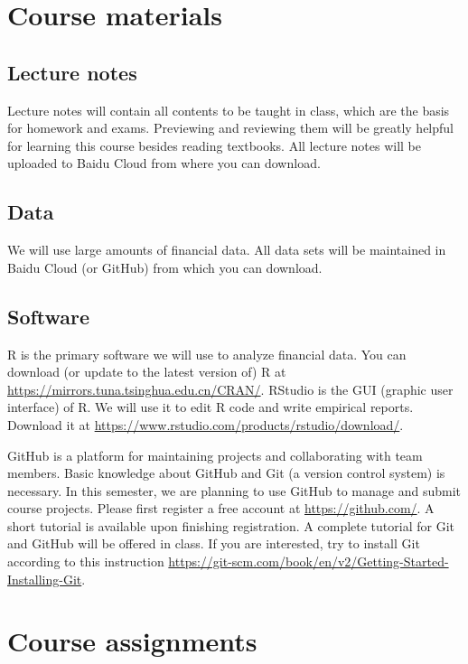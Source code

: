 \documentclass[a4paper,11pt]{article}
\begin{document}
\section{Course materials}
\label{sec:orgc5b5fd5}

\subsection*{Lecture notes}
\label{sec:orga87e58d}

Lecture notes will contain all contents to be taught in class, which
are the basis for homework and exams. Previewing and reviewing them
will be greatly helpful for learning this course besides reading
textbooks. All lecture notes will be uploaded to Baidu Cloud from
where you can download. 


\subsection*{Data}
\label{sec:orgb496d52}

We will use large amounts of financial data. All data sets will be
maintained in Baidu Cloud (or GitHub) from which you can download.

\subsection*{Software}
\label{sec:org17f6109}

R is the primary software we will use to analyze financial data. You
can download (or update to the latest version of) R at
\url{https://mirrors.tuna.tsinghua.edu.cn/CRAN/}. RStudio is the GUI
(graphic user interface) of R. We will use it to edit R code and write
empirical reports. Download it at
\url{https://www.rstudio.com/products/rstudio/download/}.

GitHub is a platform for maintaining projects and collaborating with
team members. Basic knowledge about GitHub and Git (a version control
system) is necessary. In this semester, we are planning to use GitHub
to manage and submit course projects. Please first register a free
account at \url{https://github.com/}. A short tutorial is available upon
finishing registration. A complete tutorial for Git and GitHub will be
offered in class. If you are interested, try to install Git according to
this instruction
\url{https://git-scm.com/book/en/v2/Getting-Started-Installing-Git}.


\section{Course assignments}
\label{sec:orgc3da81e}
\end{document}
